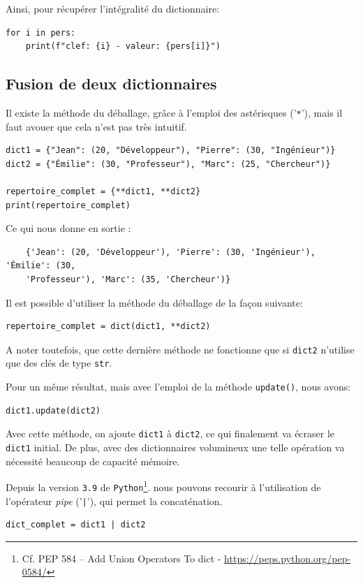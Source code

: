 \documentclass[a4paper,12pt]{book}
\begin{document}
Ainsi, pour récupérer l'intégralité du dictionnaire:
\begin{lstlisting}
for i in pers:
    print(f"clef: {i} - valeur: {pers[i]}")
\end{lstlisting}
\medskip

\subsection*{Fusion de deux dictionnaires}\label{fusion_dict}
Il existe la méthode du déballage, grâce à l'emploi des astérisques ('\texttt{*}'), mais il faut avouer que cela n'est pas très intuitif.
\begin{lstlisting}
dict1 = {"Jean": (20, "Développeur"), "Pierre": (30, "Ingénieur")}
dict2 = {"Émilie": (30, "Professeur"), "Marc": (25, "Chercheur")}

repertoire_complet = {**dict1, **dict2}
print(repertoire_complet)
\end{lstlisting}
\medskip

Ce qui nous donne en sortie :
\begin{verbatim}
    {'Jean': (20, 'Développeur'), 'Pierre': (30, 'Ingénieur'), 'Émilie': (30, 
    'Professeur'), 'Marc': (35, 'Chercheur')}
\end{verbatim}
\medskip

Il est possible d'utiliser la méthode du déballage de la façon suivante:
\begin{lstlisting}
repertoire_complet = dict(dict1, **dict2)
\end{lstlisting}
\medskip

A noter toutefois, que cette dernière méthode ne fonctionne que si \texttt{dict2} n'utilise que des clés de type \texttt{str}.
\medskip

Pour un même résultat, mais avec l'emploi de la méthode \texttt{update()}, nous avons:
\begin{lstlisting}
dict1.update(dict2)
\end{lstlisting}
\medskip

Avec cette méthode, on ajoute \texttt{dict1} à \texttt{dict2}, ce qui finalement va écraser le \texttt{dict1} initial. De plus, avec des dictionnaires volumineux une telle opération va nécessité beaucoup de capacité mémoire.
\medskip

Depuis la version \texttt{3.9} de \texttt{Python}\footnote{Cf. PEP 584 – Add Union Operators To dict - \url{https://peps.python.org/pep-0584/}}. nous pouvons recourir à l'utilisation de l'opérateur \textit{pipe} ('\texttt{|}'), qui permet la concaténation.
\begin{lstlisting}
dict_complet = dict1 | dict2
\end{lstlisting}
\medskip
\end{document}
